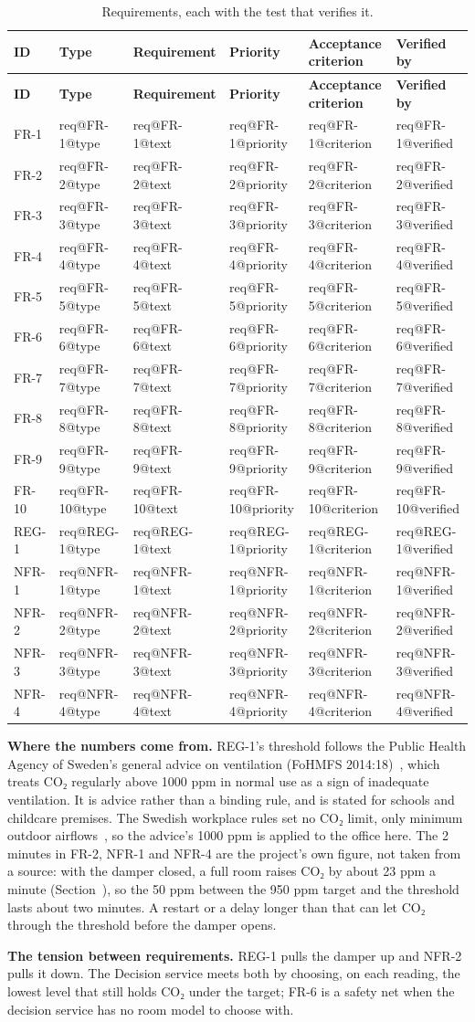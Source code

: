 \documentclass[11pt]{article}
\makeatletter
\newcommand{\reqfield}[2]{\csname req@#1@#2\endcsname}
\newcommand{\reqrow}[1]{%
  \mbox{\hypertarget{req:#1}{#1}} & \reqfield{#1}{type} & \reqfield{#1}{text}
  & \reqfield{#1}{priority} & \reqfield{#1}{criterion}
  & \reqfield{#1}{verified} \\}
\newcommand{\req}[1]{\pdftooltip{\hyperlink{req:#1}{#1}}%
  {#1: \reqfield{#1}{text}. Criterion: \reqfield{#1}{criterion}.}}
\def\ref#1{\getrefnumber{#1}}%
\def\req#1{#1}}
\makeatother
\begin{document}
\begin{longtable}[]{@{}
  >{\raggedright\arraybackslash}p{}
  >{\raggedright\arraybackslash}p{}
  >{\raggedright\arraybackslash}p{}
  >{\raggedright\arraybackslash}p{}
  >{\raggedright\arraybackslash}p{}
  >{\raggedright\arraybackslash}p{}@{}}
\caption{Requirements, each with the test that verifies it.}\label{tab:requirements}\\
\toprule
\textbf{ID} & \textbf{Type} & \textbf{Requirement} & \textbf{Priority}
& \textbf{Acceptance criterion} & \textbf{Verified by} \\
\midrule
\endfirsthead
\toprule
\textbf{ID} & \textbf{Type} & \textbf{Requirement} & \textbf{Priority}
& \textbf{Acceptance criterion} & \textbf{Verified by} \\
\midrule
\endhead
\reqrow{FR-1}
\midrule
\reqrow{FR-2}
\midrule
\reqrow{FR-3}
\midrule
\reqrow{FR-4}
\midrule
\reqrow{FR-5}
\midrule
\reqrow{FR-6}
\midrule
\reqrow{FR-7}
\midrule
\reqrow{FR-8}
\midrule
\reqrow{FR-9}
\midrule
\reqrow{FR-10}
\midrule
\reqrow{REG-1}
\midrule
\reqrow{NFR-1}
\midrule
\reqrow{NFR-2}
\midrule
\reqrow{NFR-3}
\midrule
\reqrow{NFR-4}
\bottomrule
\end{longtable}

\textbf{Where the numbers come from.} \req{REG-1}'s threshold follows the
Public Health Agency of Sweden's general advice on ventilation
(FoHMFS 2014:18)~\cite{fohmfs2014}, which treats CO₂ regularly above 1000 ppm in normal
use as a sign of inadequate ventilation. It is advice rather than a
binding rule, and is stated for schools and childcare premises. The
Swedish workplace rules set no CO₂ limit, only minimum outdoor
airflows~\cite[p.~39]{afs2023}, so the advice's 1000 ppm is applied to
the office here. The 2 minutes in \req{FR-2}, \req{NFR-1} and
\req{NFR-4} are the project's own figure, not taken from a source: with the damper
closed, a full room raises CO₂ by about 23 ppm a minute (Section~\ref{sec:simulation}), so
the 50 ppm between the 950 ppm target and the threshold lasts about two
minutes. A restart or a delay longer than that can let CO₂ through the
threshold before the damper opens.

\textbf{The tension between requirements.} \req{REG-1} pulls the damper up and \req{NFR-2}
pulls it down. The Decision service meets both by choosing, on each
reading, the lowest level that still holds CO₂ under the target; \req{FR-6} is
a safety net when the decision service has no room model to choose with.
\end{document}
